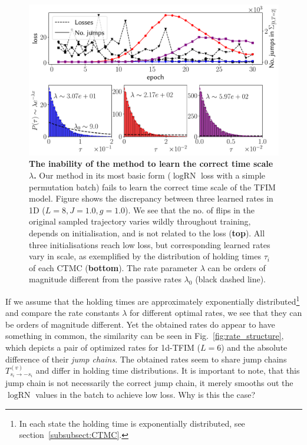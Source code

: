 \begin{figure}[t]
	\centering
	\includegraphics[width=\linewidth]{Chapter5/Figs/Vector/scale_blowup}
	\caption[The inability of the method to learn the correct time scale $\lambda$]{\textbf{The inability of the method to learn the correct time scale $\lambda$.} Our method in its most basic form ($\log \text{RN}$ loss with a simple permutation batch) fails to learn the correct time scale of the TFIM model. Figure shows the discrepancy between three learned rates in 1D ($L=8, J=1.0, g=1.0$). We see that the no. of flips in the original sampled trajectory varies wildly throughout training, depends on initialisation, and is not related to the loss (\textbf{top}). All three initialisations reach low loss, but corresponding learned rates vary in scale, as exemplified by the distribution of holding times $\tau_i$ of each CTMC (\textbf{bottom}). The rate parameter $\lambda$ can be orders of magnitude different from the passive rates $\lambda_0$ (black dashed line).}
	\label{fig:scaleblowup}
\end{figure}
If we assume that the holding times are approximately exponentially distributed\footnote{In each state the holding time is exponentially distributed, see section~\ref{subsubsect:CTMC}.} and compare the rate constants $\lambda$ for different optimal rates, we see that they can be orders of magnitude different. Yet the obtained rates do appear to have something in common, the similarity can be seen in Fig.~\ref{fig:rate_structure}, which depicts a pair of optimized rates for 1d-TFIM ($L=6$) and the absolute difference of their \emph{jump chains}. The obtained rates seem to share jump chains $T^{(v)}_{s_i \rightarrow -s_i}$ and differ in holding time distributions. It is important to note, that this jump chain is not necessarily the correct jump chain, it merely smooths out the $\log \text{RN}$ values in the batch to achieve low loss. Why is this the case?
